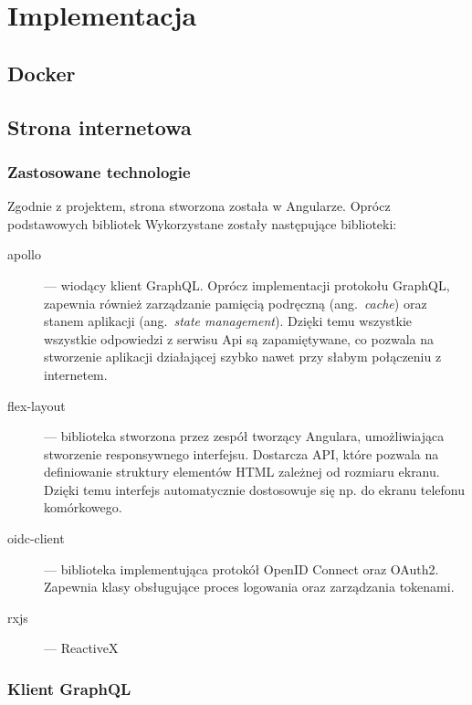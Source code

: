 \chapter{Implementacja}
\label{sec:implementacja}

\section{Docker}

\section{Strona internetowa}
	\subsection{Zastosowane technologie}
		Zgodnie z projektem, strona stworzona została w Angularze.
		Oprócz podstawowych bibliotek Wykorzystane zostały następujące biblioteki:
		\begin{description}
			\item[apollo] --- wiodący klient GraphQL. Oprócz implementacji protokołu GraphQL,
			zapewnia również zarządzanie pamięcią podręczną (ang.\ \emph{cache}) oraz stanem aplikacji (ang.\ \emph{state management}).
			Dzięki temu wszystkie wszystkie odpowiedzi z serwisu Api są zapamiętywane,
			co pozwala na stworzenie aplikacji działającej szybko nawet przy słabym połączeniu z internetem.
			
			\item[flex-layout] --- biblioteka stworzona przez zespół tworzący Angulara, umożliwiająca stworzenie responsywnego interfejsu.
				Dostarcza API, które pozwala na definiowanie struktury elementów HTML zależnej od rozmiaru ekranu.
				Dzięki temu interfejs automatycznie dostosowuje się np. do ekranu telefonu komórkowego.
			
			\item[oidc-client] --- biblioteka implementująca protokół OpenID Connect oraz OAuth2.
				Zapewnia klasy obsługujące proces logowania oraz zarządzania tokenami.

			\item[rxjs] --- ReactiveX 

		\end{description}

	\subsection{Klient GraphQL}

